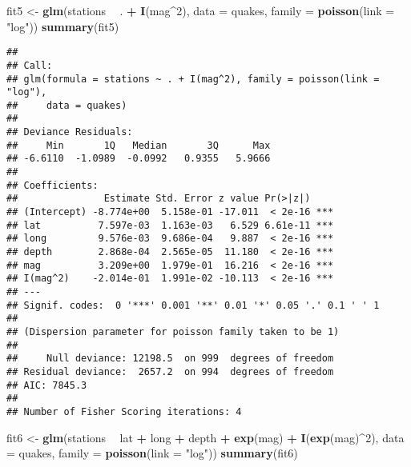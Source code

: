 \documentclass[
]{article}
\newenvironment{Shaded}{\begin{snugshade}}{\end{snugshade}}
\newcommand{\DataTypeTok}[1]{\textcolor[rgb]{0.13,0.29,0.53}{#1}}
\newcommand{\DecValTok}[1]{\textcolor[rgb]{0.00,0.00,0.81}{#1}}
\newcommand{\KeywordTok}[1]{\textcolor[rgb]{0.13,0.29,0.53}{\textbf{#1}}}
\newcommand{\NormalTok}[1]{#1}
\newcommand{\OperatorTok}[1]{\textcolor[rgb]{0.81,0.36,0.00}{\textbf{#1}}}
\newcommand{\StringTok}[1]{\textcolor[rgb]{0.31,0.60,0.02}{#1}}
\begin{document}
\begin{Shaded}
\begin{Highlighting}[]
\NormalTok{fit5 <-}\StringTok{ }\KeywordTok{glm}\NormalTok{(stations }\OperatorTok{~}\StringTok{ }\NormalTok{. }\OperatorTok{+}\StringTok{ }\KeywordTok{I}\NormalTok{(mag}\OperatorTok{^}\DecValTok{2}\NormalTok{), }\DataTypeTok{data =}\NormalTok{ quakes, }
            \DataTypeTok{family =} \KeywordTok{poisson}\NormalTok{(}\DataTypeTok{link =} \StringTok{"log"}\NormalTok{))}
\KeywordTok{summary}\NormalTok{(fit5)}
\end{Highlighting}
\end{Shaded}

\begin{verbatim}
## 
## Call:
## glm(formula = stations ~ . + I(mag^2), family = poisson(link = "log"), 
##     data = quakes)
## 
## Deviance Residuals: 
##     Min       1Q   Median       3Q      Max  
## -6.6110  -1.0989  -0.0992   0.9355   5.9666  
## 
## Coefficients:
##               Estimate Std. Error z value Pr(>|z|)    
## (Intercept) -8.774e+00  5.158e-01 -17.011  < 2e-16 ***
## lat          7.597e-03  1.163e-03   6.529 6.61e-11 ***
## long         9.576e-03  9.686e-04   9.887  < 2e-16 ***
## depth        2.868e-04  2.565e-05  11.180  < 2e-16 ***
## mag          3.209e+00  1.979e-01  16.216  < 2e-16 ***
## I(mag^2)    -2.014e-01  1.991e-02 -10.113  < 2e-16 ***
## ---
## Signif. codes:  0 '***' 0.001 '**' 0.01 '*' 0.05 '.' 0.1 ' ' 1
## 
## (Dispersion parameter for poisson family taken to be 1)
## 
##     Null deviance: 12198.5  on 999  degrees of freedom
## Residual deviance:  2657.2  on 994  degrees of freedom
## AIC: 7845.3
## 
## Number of Fisher Scoring iterations: 4
\end{verbatim}

\begin{Shaded}
\begin{Highlighting}[]
\NormalTok{fit6 <-}\StringTok{ }\KeywordTok{glm}\NormalTok{(stations }\OperatorTok{~}\StringTok{ }\NormalTok{lat }\OperatorTok{+}\StringTok{ }\NormalTok{long }\OperatorTok{+}\StringTok{ }\NormalTok{depth }\OperatorTok{+}\StringTok{ }\KeywordTok{exp}\NormalTok{(mag) }\OperatorTok{+}\StringTok{ }\KeywordTok{I}\NormalTok{(}\KeywordTok{exp}\NormalTok{(mag)}\OperatorTok{^}\DecValTok{2}\NormalTok{), }
            \DataTypeTok{data =}\NormalTok{ quakes, }\DataTypeTok{family =} \KeywordTok{poisson}\NormalTok{(}\DataTypeTok{link =} \StringTok{"log"}\NormalTok{))}
\KeywordTok{summary}\NormalTok{(fit6)}
\end{Highlighting}
\end{Shaded}
\end{document}
